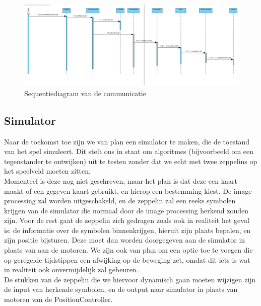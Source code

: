 \documentclass[eind]{penoverslag}
\begin{document}
\begin{figure}[H]
\begin{center}
\includegraphics[width=1\textwidth]{PiToClientCommunication.png}
\end{center}
\caption{Sequentiediagram van de communicatie}
\label{Sequence}
\end{figure}

\subsection{Simulator}
Naar de toekomst toe zijn we van plan een simulator te maken, die de toestand van het spel simuleert. Dit stelt ons in staat om algoritmes (bijvoorbeeld om een tegenstander te ontwijken) uit te testen zonder dat we echt met twee zeppelins op het speelveld moeten zitten.\\
Momenteel is deze nog niet geschreven, maar het plan is dat deze een kaart maakt of een gegeven kaart gebruikt, en hierop een bestemming kiest. De image processing zal worden uitgeschakeld, en de zeppelin zal een reeks symbolen krijgen van de simulator die normaal door de image processing herkend zouden zijn. Voor de rest gaat de zeppelin zich gedragen zoals ook in realiteit het geval is: de informatie over de symbolen binnenkrijgen, hieruit zijn plaats bepalen, en zijn positie bijsturen. Deze moet dan worden doorgegeven aan de simulator in plaats van aan de motoren. We zijn ook van plan om een optie toe te voegen die op geregelde tijdstippen een afwijking op de beweging zet, omdat dit iets is wat in realiteit ook onvermijdelijk zal gebeuren.\\
De stukken van de zeppelin die we hiervoor dynamisch gaan moeten wijzigen zijn de input van herkende symbolen, en de output naar simulator in plaats van motoren van de PositionController.


\end{document}
